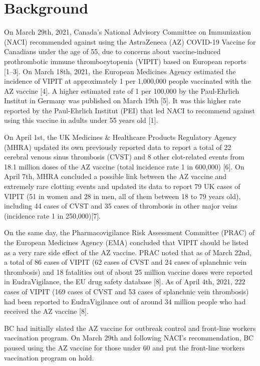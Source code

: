 \documentclass[]{elsarticle} %
\begin{document}
\hypertarget{background}{%
\section{Background}\label{background}}

On March 29th, 2021, Canada's National Advisory Committee on
Immunization (NACI) recommended against using the AstraZeneca (AZ)
COVID-19 Vaccine for Canadians under the age of 55, due to concerns
about vaccine-induced prothrombotic immune thrombocytopenia (VIPIT)
based on European reports {[}1--3{]}. On March 18th, 2021, the European
Medicines Agency estimated the incidence of VIPIT at approximately 1 per
1,000,000 people vaccinated with the AZ vaccine {[}4{]}. A higher
estimated rate of 1 per 100,000 by the Paul-Ehrlich Institut in Germany
was published on March 19th {[}5{]}. It was this higher rate reported by
the Paul-Ehrlich Institut (PEI) that led NACI to recommend against using
this vaccine in adults under 55 years old {[}1{]}.

On April 1st, the UK Medicines \& Healthcare Products Regulatory Agency
(MHRA) updated its own previously reported data to report a total of 22
cerebral venous sinus thrombosis (CVST) and 8 other clot-related events
from 18.1 million doses of the AZ vaccine (total incidence rate 1 in
600,000) {[}6{]}. On April 7th, MHRA concluded a possible link between
the AZ vaccine and extremely rare clotting events and updated its data
to report 79 UK cases of VIPIT (51 in women and 28 in men, all of them
between 18 to 79 years old), including 44 cases of CVST and 35 cases of
thrombosis in other major veins (incidence rate 1 in 250,000){[}7{]}.

On the same day, the Pharmacovigilance Risk Assessment Committee (PRAC)
of the European Medicines Agency (EMA) concluded that VIPIT should be
listed as a very rare side effect of the AZ vaccine. PRAC noted that as
of March 22nd, a total of 86 cases of VIPIT (62 cases of CVST and 24
cases of splanchnic vein thrombosis) and 18 fatalities out of about 25
million vaccine doses were reported in EudraVigilance, the EU drug
safety database {[}8{]}. As of April 4th, 2021, 222 cases of VIPIT (169
cases of CVST and 53 cases of splanchnic vein thrombosis) had been
reported to EudraVigilance out of around 34 million people who had
received the AZ vaccine {[}8{]}.

BC had initially slated the AZ vaccine for outbreak control and
front-line workers vaccination program. On March 29th and following
NACI's recommendation, BC paused using the AZ vaccine for those under 60
and put the front-line workers vaccination program on hold.
\end{document}
